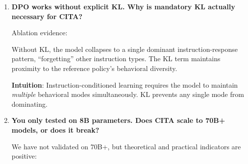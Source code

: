 \begin{enumerate}[label=\textbf{Q\arabic*.}, leftmargin=*, itemsep=8pt]
\textbf{Why the gap?} Prompting operates at the surface level---the model \textit{follows} instructions but doesn't \textit{internalize} them. CITA trains instruction-conditioned preferences into the weights, making behavioral changes robust to adversarial prompt injections.

\textbf{Jailbreak resistance}: Prompt-based control is trivially bypassed by ``ignore previous instructions.'' CITA's trained behavior resists such attacks.

\vspace{4mm}

\item \textbf{DPO works without explicit KL. Why is mandatory KL actually necessary for CITA?}

 Ablation evidence:

\begin{table}[ht!]
\centering
\normalsize
\renewcommand{\arraystretch}{1.2}
\caption{Ablation: effect of mandatory KL ($\lambda_{\text{KL}}$) on CITA performance.}
\label{tab:faq_kl_ablation}
\end{table}

Without KL, the model collapses to a single dominant instruction-response pattern, ``forgetting'' other instruction types. The KL term maintains proximity to the reference policy's behavioral diversity.

\textbf{Intuition}: Instruction-conditioned learning requires the model to maintain \textit{multiple} behavioral modes simultaneously. KL prevents any single mode from dominating.

\vspace{4mm}

\item \textbf{You only tested on 8B parameters. Does CITA scale to 70B+ models, or does it break?}

 We have not validated on 70B+, but theoretical and practical indicators are positive:


\end{enumerate}
